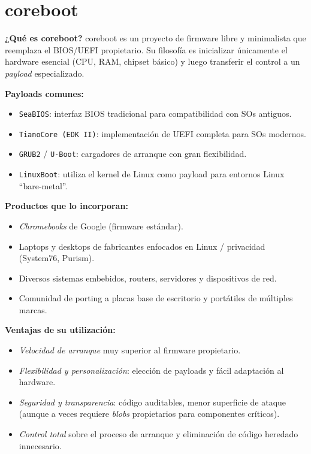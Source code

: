 \documentclass[a4paper,12pt]{article}
\begin{document}
\section{coreboot}

\textbf{¿Qué es coreboot?}  
coreboot es un proyecto de firmware libre y minimalista que reemplaza el BIOS/UEFI propietario. Su filosofía es inicializar únicamente el hardware esencial (CPU, RAM, chipset básico) y luego transferir el control a un \emph{payload} especializado.

\medskip
\textbf{Payloads comunes:}
\begin{itemize}[noitemsep]
  \item \texttt{SeaBIOS}: interfaz BIOS tradicional para compatibilidad con SOs antiguos.
  \item \texttt{TianoCore (EDK II)}: implementación de UEFI completa para SOs modernos.
  \item \texttt{GRUB2} / \texttt{U-Boot}: cargadores de arranque con gran flexibilidad.
  \item \texttt{LinuxBoot}: utiliza el kernel de Linux como payload para entornos Linux “bare-metal”.
\end{itemize}

\medskip
\textbf{Productos que lo incorporan:}
\begin{itemize}[noitemsep]
  \item \emph{Chromebooks} de Google (firmware estándar).
  \item Laptops y desktops de fabricantes enfocados en Linux / privacidad (System76, Purism).
  \item Diversos sistemas embebidos, routers, servidores y dispositivos de red.
  \item Comunidad de porting a placas base de escritorio y portátiles de múltiples marcas.
\end{itemize}

\medskip
\textbf{Ventajas de su utilización:}
\begin{itemize}[noitemsep]
  \item \emph{Velocidad de arranque} muy superior al firmware propietario.
  \item \emph{Flexibilidad y personalización}: elección de payloads y fácil adaptación al hardware.
  \item \emph{Seguridad y transparencia}: código auditables, menor superficie de ataque (aunque a veces requiere \emph{blobs} propietarios para componentes críticos).
  \item \emph{Control total} sobre el proceso de arranque y eliminación de código heredado innecesario.
\end{itemize}
\end{document}
